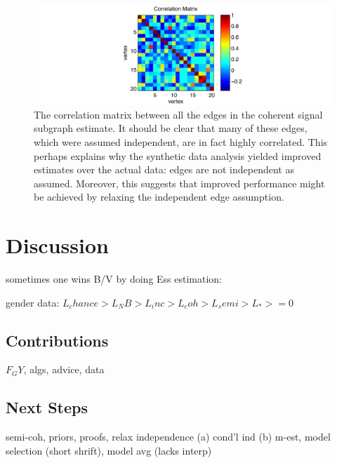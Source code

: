\documentclass[10pt,journal,cspaper,compsoc]{IEEEtran}
\begin{document}
\begin{figure}[htbp]
	\centering
		\includegraphics[width=1.0\linewidth]{../figs/cov_BLSA0317_rates_rates.pdf}
	\caption{The correlation matrix between all the edges in the coherent signal subgraph estimate. It should be clear that many of these edges, which were assumed independent, are in fact highly correlated.  This perhaps explains why the synthetic data analysis yielded improved estimates over the actual data: edges are not independent as assumed.  Moreover, this suggests that improved performance might be achieved by relaxing the independent edge assumption.}
	\label{fig:cov}
\end{figure}






\section{Discussion} %
\label{sec:discussion}

sometimes one wins B/V by doing Ess estimation:

gender data: $L_chance > L_NB > L_inc > L_coh > L_semi > L_* >= 0$


\subsection{Contributions} %
\label{sub:contributions}

$F_GY$, algs, advice, data



\subsection{Next Steps} %
\label{sub:next_steps}

semi-coh, priors, proofs, relax independence (a) cond'l ind (b) m-est, model selection (short shrift), model avg (lacks interp)
\end{document}

